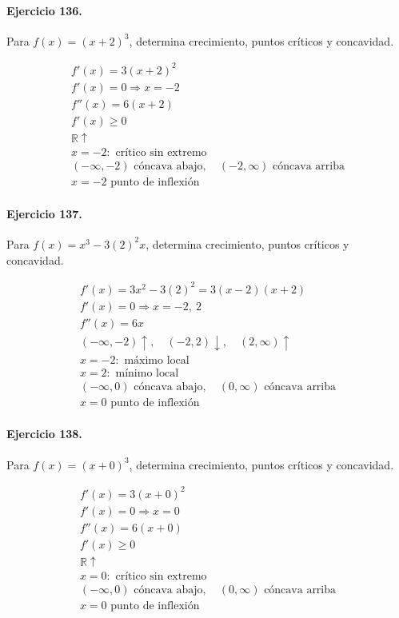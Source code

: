 \documentclass[11pt,a4paper]{article}
\begin{document}
\paragraph{Ejercicio 136.} Para $f(x)=(x+2)^3$, determina crecimiento, puntos críticos y concavidad.

\[
\begin{aligned}
f'(x)=3(x+2)^2\\
f'(x)=0\Rightarrow x=-2\\
f''(x)=6(x+2)\\
f'(x)\ge0\\
\mathbb{R}\uparrow\\
x=-2:\text{ crítico sin extremo}\\
(-\infty,-2)\text{ cóncava abajo},\quad(-2,\infty)\text{ cóncava arriba}\\
x=-2\text{ punto de inflexión}
\end{aligned}
\]


\paragraph{Ejercicio 137.} Para $f(x)=x^3-3(2)^2x$, determina crecimiento, puntos críticos y concavidad.

\[
\begin{aligned}
f'(x)=3x^2-3(2)^2=3(x-2)(x+2)\\
f'(x)=0\Rightarrow x=-2,\ 2\\
f''(x)=6x\\
(-\infty,-2)\uparrow,\quad(-2,2)\downarrow,\quad(2,\infty)\uparrow\\
x=-2:\text{ máximo local}\\
x=2:\text{ mínimo local}\\
(-\infty,0)\text{{ cóncava abajo}},\quad(0,\infty)\text{{ cóncava arriba}}\\
x=0\text{{ punto de inflexión}}
\end{aligned}
\]


\paragraph{Ejercicio 138.} Para $f(x)=(x+0)^3$, determina crecimiento, puntos críticos y concavidad.

\[
\begin{aligned}
f'(x)=3(x+0)^2\\
f'(x)=0\Rightarrow x=0\\
f''(x)=6(x+0)\\
f'(x)\ge0\\
\mathbb{R}\uparrow\\
x=0:\text{ crítico sin extremo}\\
(-\infty,0)\text{ cóncava abajo},\quad(0,\infty)\text{ cóncava arriba}\\
x=0\text{ punto de inflexión}
\end{aligned}
\]
\end{document}
